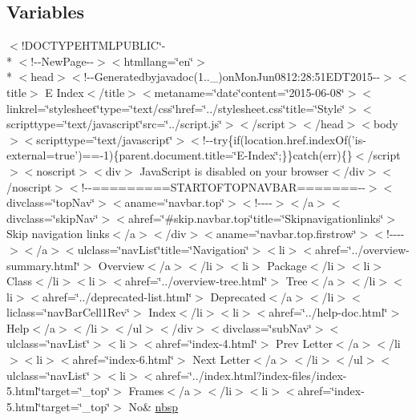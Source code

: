 \subsection*{Variables}
\begin{DoxyCompactItemize}
\item 
$<$!D\-O\-C\-T\-Y\-P\-E\-H\-T\-M\-L\-P\-U\-B\-L\-I\-C\char`\"{}-\/\\*
$<$!-\/-\/New\-Page-\/-\/$>$$<$htmllang=\char`\"{}en\char`\"{}$>$\\*
$<$head$>$$<$!-\/-\/Generatedbyjavadoc(1..\-\_)on\-Mon\-Jun0812\-:28\-:51\-E\-D\-T2015-\/-\/$>$$<$title$>$ E Index$<$/title$>$$<$metaname=\char`\"{}date\char`\"{}content=\char`\"{}2015-\/06-\/08\char`\"{}$>$$<$linkrel=\char`\"{}stylesheet\char`\"{}type=\char`\"{}text/css\char`\"{}href=\char`\"{}../stylesheet.\-css\char`\"{}title=\char`\"{}\-Style\char`\"{}$>$$<$scripttype=\char`\"{}text/javascript\char`\"{}src=\char`\"{}../script.\-js\char`\"{}$>$$<$/script$>$$<$/head$>$$<$body$>$$<$scripttype=\char`\"{}text/javascript\char`\"{}$>$$<$!-\/-\/try\{if(location.\-href.\-index\-Of('is-\/external=true')==-\/1)\{parent.\-document.\-title=\char`\"{}\-E-\/\-Index\char`\"{};\}\}catch(err)\{\}$<$/script$>$$<$noscript$>$$<$div$>$ Java\-Script is disabled on your browser$<$/div$>$$<$/noscript$>$$<$!-\/-\/=========\-S\-T\-A\-R\-T\-O\-F\-T\-O\-P\-N\-A\-V\-B\-A\-R=======-\/-\/$>$$<$divclass=\char`\"{}top\-Nav\char`\"{}$>$$<$aname=\char`\"{}navbar.\-top\char`\"{}$>$$<$!-\/-\/-\/-\/$>$$<$/a$>$$<$divclass=\char`\"{}skip\-Nav\char`\"{}$>$$<$ahref=\char`\"{}\#skip.\-navbar.\-top\char`\"{}title=\char`\"{}\-Skipnavigationlinks\char`\"{}$>$ Skip navigation links$<$/a$>$$<$/div$>$$<$aname=\char`\"{}navbar.\-top.\-firstrow\char`\"{}$>$$<$!-\/-\/-\/-\/$>$$<$/a$>$$<$ulclass=\char`\"{}nav\-List\char`\"{}title=\char`\"{}\-Navigation\char`\"{}$>$$<$li$>$$<$ahref=\char`\"{}../overview-\/summary.\-html\char`\"{}$>$ Overview$<$/a$>$$<$/li$>$$<$li$>$ Package$<$/li$>$$<$li$>$ Class$<$/li$>$$<$li$>$$<$ahref=\char`\"{}../overview-\/tree.\-html\char`\"{}$>$ Tree$<$/a$>$$<$/li$>$$<$li$>$$<$ahref=\char`\"{}../deprecated-\/list.\-html\char`\"{}$>$ Deprecated$<$/a$>$$<$/li$>$$<$liclass=\char`\"{}nav\-Bar\-Cell1\-Rev\char`\"{}$>$ Index$<$/li$>$$<$li$>$$<$ahref=\char`\"{}../help-\/doc.\-html\char`\"{}$>$ Help$<$/a$>$$<$/li$>$$<$/ul$>$$<$/div$>$$<$divclass=\char`\"{}sub\-Nav\char`\"{}$>$$<$ulclass=\char`\"{}nav\-List\char`\"{}$>$$<$li$>$$<$ahref=\char`\"{}index-\/4.\-html\char`\"{}$>$ Prev Letter$<$/a$>$$<$/li$>$$<$li$>$$<$ahref=\char`\"{}index-\/6.\-html\char`\"{}$>$ Next Letter$<$/a$>$$<$/li$>$$<$/ul$>$$<$ulclass=\char`\"{}nav\-List\char`\"{}$>$$<$li$>$$<$ahref=\char`\"{}../index.\-html?index-\/files/index-\/5.\-html\char`\"{}target=\char`\"{}\-\_\-top\char`\"{}$>$ Frames$<$/a$>$$<$/li$>$$<$li$>$$<$ahref=\char`\"{}index-\/5.\-html\char`\"{}target=\char`\"{}\-\_\-top\char`\"{}$>$ No\& \hyperlink{index-5_8html_a479d00f21dbca369efe3be97f1ef785a}{nbsp}
\end{DoxyCompactItemize}


